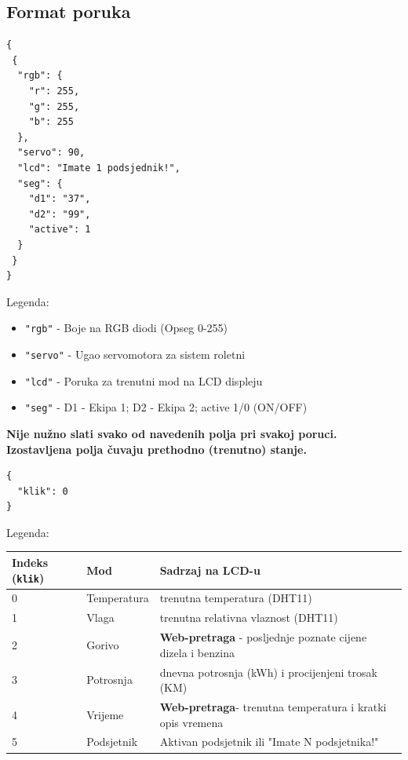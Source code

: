 \documentclass[11pt,a4paper]{article}
\begin{document}
\subsection{Format poruka}

\begin{lstlisting}[style=json,caption={tim12/pico/cmd - Upravljanje picoETF sistemom}]
{
 {
  "rgb": {
    "r": 255,
    "g": 255,
    "b": 255
  },
  "servo": 90,
  "lcd": "Imate 1 podsjednik!",
  "seg": {
    "d1": "37",
    "d2": "99",
    "active": 1
  }
 }
}
\end{lstlisting}

Legenda:
\begin{itemize}[nosep]
      \item \texttt{"rgb"} - Boje na RGB diodi (Opseg 0-255)
      \item \texttt{"servo"} - Ugao servomotora za sistem roletni
      \item \texttt{"lcd"} - Poruka za trenutni mod na LCD displeju
      \item \texttt{"seg"} - D1 - Ekipa 1; D2 - Ekipa 2; active 1/0 (ON/OFF)
\end{itemize}
\textbf{Nije nužno slati svako od navedenih polja pri svakoj poruci. Izostavljena polja čuvaju prethodno (trenutno) stanje.}

\begin{lstlisting}[style=json,caption={tim12/pico/state - Fizičko upravljanje kontrolnog panela:}]
{
  "klik": 0
}
\end{lstlisting}
Legenda:
{\small
\begin{center}
      \label{fig:lcdmod}
      \begin{tabularx}{\textwidth}{@{}l l X@{}}
            \toprule
            \textbf{Indeks (\texttt{klik})} & \textbf{Mod} & \textbf{Sadrzaj na LCD-u}                                          \\
            \midrule
            0                               & Temperatura  & trenutna temperatura (DHT11)                                       \\
            1                               & Vlaga        & trenutna relativna vlaznost (DHT11)                                \\
            2                               & Gorivo       & \textbf{Web-pretraga} - posljednje poznate cijene dizela i benzina \\
            3                               & Potrosnja    & dnevna potrosnja (kWh) i procijenjeni trosak (KM)                  \\
            4                               & Vrijeme      & \textbf{Web-pretraga}- trenutna temperatura i kratki opis vremena  \\
            5                               & Podsjetnik   & Aktivan podsjetnik ili "Imate N podsjetnika!"                      \\
            \bottomrule
      \end{tabularx}
\end{center}
}
\end{document}
